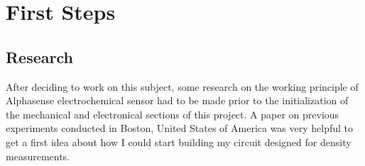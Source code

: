 \chapter{First Steps}
\label{sec:firststeps}

\section{Research}
After deciding to work on this subject, some research on the working principle of Alphasense  electrochemical sensor had to be made prior to the initialization of the mechanical and electronical sections of this project. A paper on previous experiments conducted in Boston, United States of America was very helpful to get a first idea about how I could start building my circuit designed for  density measurements. 